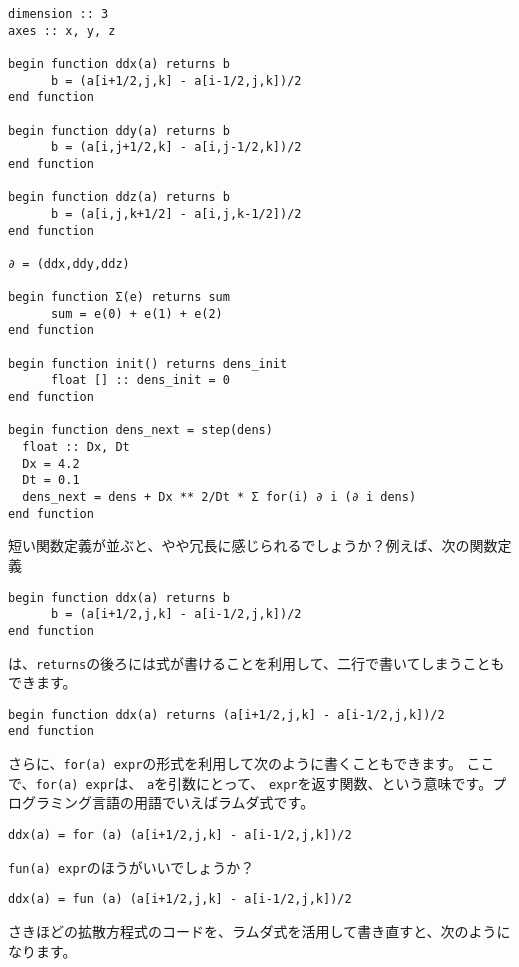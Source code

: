 \documentclass{jsarticle}
\begin{document}
\begin{lstlisting}[mathescape]
dimension :: 3
axes :: x, y, z

begin function ddx(a) returns b
      b = (a[i+1/2,j,k] - a[i-1/2,j,k])/2
end function

begin function ddy(a) returns b
      b = (a[i,j+1/2,k] - a[i,j-1/2,k])/2
end function

begin function ddz(a) returns b
      b = (a[i,j,k+1/2] - a[i,j,k-1/2])/2
end function

∂ = (ddx,ddy,ddz)

begin function Σ(e) returns sum
      sum = e(0) + e(1) + e(2)
end function

begin function init() returns dens_init
      float [] :: dens_init = 0
end function

begin function dens_next = step(dens)
  float :: Dx, Dt
  Dx = 4.2
  Dt = 0.1
  dens_next = dens + Dx ** 2/Dt * Σ for(i) ∂ i (∂ i dens)
end function
\end{lstlisting}

短い関数定義が並ぶと、やや冗長に感じられるでしょうか？例えば、次の関数定義

\begin{lstlisting}[mathescape]
begin function ddx(a) returns b
      b = (a[i+1/2,j,k] - a[i-1/2,j,k])/2
end function
\end{lstlisting}

は、\verb`returns`の後ろには式が書けることを利用して、二行で書いてしまうこともできます。

\begin{lstlisting}[mathescape]
begin function ddx(a) returns (a[i+1/2,j,k] - a[i-1/2,j,k])/2
end function
\end{lstlisting}

さらに、\verb`for(a) expr`の形式を利用して次のように書くこともできます。
ここで、\verb`for(a) expr`は、
\verb`a`を引数にとって、
\verb`expr`を返す関数、という意味です。プログラミング言語の用語でいえばラムダ式です。

\begin{lstlisting}[mathescape]
ddx(a) = for (a) (a[i+1/2,j,k] - a[i-1/2,j,k])/2
\end{lstlisting}

\verb`fun(a) expr`のほうがいいでしょうか？

\begin{lstlisting}[mathescape]
ddx(a) = fun (a) (a[i+1/2,j,k] - a[i-1/2,j,k])/2
\end{lstlisting}


さきほどの拡散方程式のコードを、ラムダ式を活用して書き直すと、次のようになります。
\end{document}
